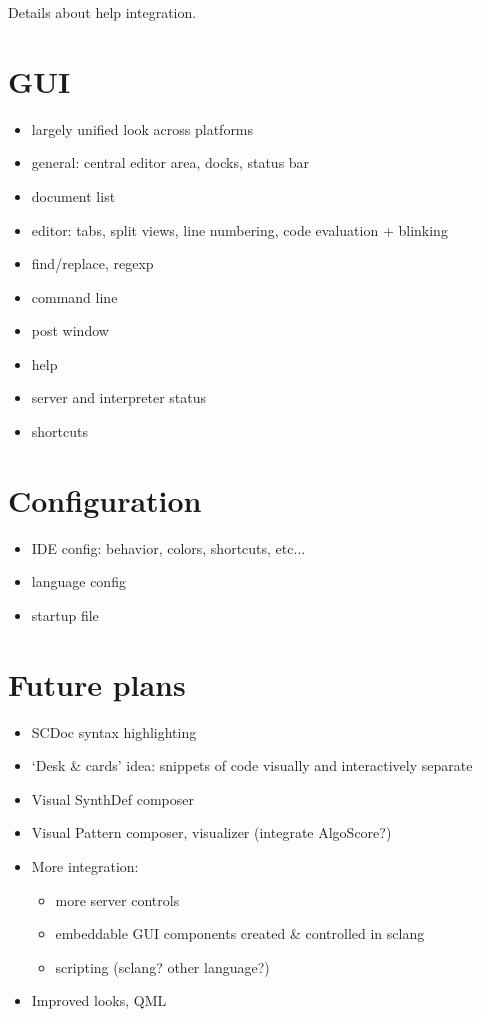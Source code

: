 \documentclass[a4paper,10pt]{article}
\begin{document}
Details about help integration.

\section{GUI}

\begin{itemize}
 \item largely unified look across platforms
 \item general: central editor area, docks, status bar
 \item document list
 \item editor: tabs, split views, line numbering, code evaluation + blinking
 \item find/replace, regexp
 \item command line
 \item post window
 \item help
 \item server and interpreter status
 \item shortcuts
\end{itemize}

\section{Configuration}

\begin{itemize}
 \item IDE config: behavior, colors, shortcuts, etc...
 \item language config
 \item startup file
\end{itemize}


\section{Future plans}

\begin{itemize}
 \item SCDoc syntax highlighting
 \item `Desk \& cards' idea: snippets of code visually and interactively separate
 \item Visual SynthDef composer
 \item Visual Pattern composer, visualizer (integrate AlgoScore?)
 \item More integration:
 \begin{itemize}
    \item more server controls
    \item  embeddable GUI components created \& controlled in sclang
    \item  scripting (sclang? other language?)
 \end{itemize}
 \item Improved looks, QML
\end{itemize}
\end{document}
